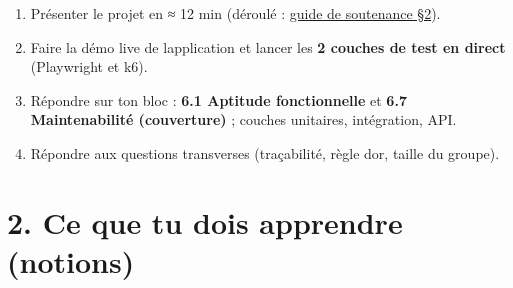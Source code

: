 \documentclass[
  11pt,
]{article}
\providecommand{\tightlist}{%
  \setlength{\itemsep}{0pt}\setlength{\parskip}{0pt}}
\begin{document}
\begin{enumerate}
\def\labelenumi{\arabic{enumi}.}
\tightlist
\item
  Présenter le projet en ≈ 12 min (déroulé : \href{SOUTENANCE.pdf}{guide
  de soutenance §2}).
\item
  Faire la démo live de l\textquotesingle application et lancer les
  \textbf{2 couches de test en direct} (Playwright et k6).
\item
  Répondre sur ton bloc : \textbf{6.1 Aptitude fonctionnelle} et
  \textbf{6.7 Maintenabilité (couverture)} ; couches unitaires,
  intégration, API.
\item
  Répondre aux questions transverses (traçabilité, règle
  d\textquotesingle or, taille du groupe).
\end{enumerate}

\section{2. Ce que tu dois apprendre
(notions)}\label{2-ce-que-tu-dois-apprendre-notions}
\end{document}
